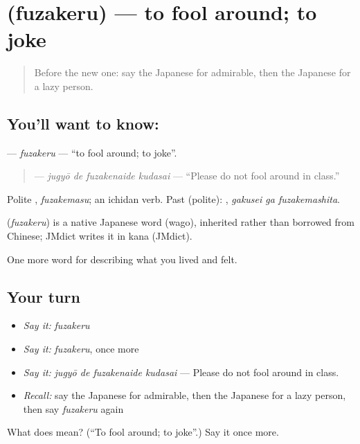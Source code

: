 \section[\texorpdfstring{\ja{ふざける} (fuzakeru)}{ふざける (fuzakeru)}]{ (fuzakeru) — to fool around; to joke}

\label{lesson:JA-C441-fuzakeru}



\begin{quote}
Before the new one: say the Japanese for admirable, then the Japanese for a lazy person.
\end{quote}

\subsection*{You'll want to know: }
\textbf{} — \emph{fuzakeru} — \textquotedblleft{}to fool around; to joke\textquotedblright{}.

\begin{quote}
\textbf{  } — \emph{jugyō de fuzakenaide kudasai} — \textquotedblleft{}Please do not fool around in class.\textquotedblright{}
\end{quote}

Polite \textbf{}, \emph{fuzakemasu}; an ichidan verb. Past (polite): \textbf{ }, \emph{gakusei ga fuzakemashita}.

\begin{cousinweb}
\textbf{} (\emph{fuzakeru}) is a native Japanese word (wago), inherited rather than borrowed from Chinese; JMdict writes it in kana (JMdict).
\end{cousinweb}

\begin{grammarlens}[title={What you've built}]
One more word for describing what you lived and felt.
\end{grammarlens}

\subsection*{Your turn}
\begin{itemize}
\raggedright
  \item \emph{Say it:} \emph{fuzakeru}
  \item \emph{Say it:} \emph{fuzakeru}, once more
  \item \emph{Say it:} \emph{jugyō de fuzakenaide kudasai} — Please do not fool around in class.
  \item \emph{Recall:} say the Japanese for admirable, then the Japanese for a lazy person, then say \emph{fuzakeru} again
\end{itemize}

\begin{tcolorbox}[breakable,colback=teal!4,colframe=teal!35!black,title={Before you move on}]
What does  mean? (\textquotedblleft{}To fool around; to joke\textquotedblright{}.) Say it once more.
\end{tcolorbox}
